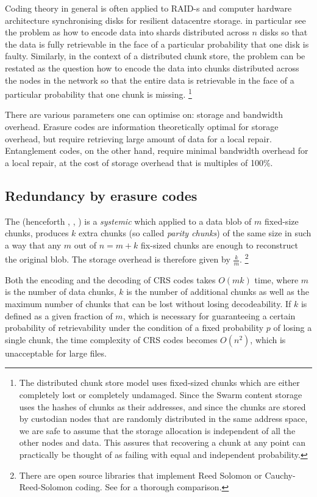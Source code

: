 Coding theory in general is often applied to RAID-s and computer hardware architecture synchronising disks for resilient datacentre storage.
 in particular see the problem as how to encode data into shards distributed across $n$ disks so that the data is fully retrievable in the face of a particular probability that one disk is faulty.
Similarly, in the context of a distributed chunk store, the problem can be restated as the question how to encode the data into chunks distributed across the nodes in the network so that the entire data is retrievable in the face of a particular probability that one chunk is missing.%
%
\footnote{The distributed chunk store model uses fixed-sized chunks which are either completely lost or completely undamaged. Since the Swarm content storage uses the hashes of chunks as their addresses, and since the chunks are stored by custodian nodes that are randomly distributed in the same address space, we are safe to assume that the storage allocation is independent of all the other nodes and data. This assures that recovering a chunk at any point can practically be thought of as failing with equal and independent probability.}

There are various parameters one can optimise on: storage and bandwidth overhead. Erasure codes are information theoretically optimal for storage overhead, but require retrieving large amount of data for a local repair.
Entanglement codes, on the other hand, require minimal bandwidth overhead for a local repair, at the cost of storage overhead that is multiples of 100\%. 

\subsection{Redundancy by erasure codes \statusgreen}\label{sec:erasure}


The  (henceforth , \cite{lubyetal1995CRS}, \cite{plank2006optimizing}) is a \emph{systemic}  which applied to a data blob of $m$ fixed-size chunks, produces $k$ extra chunks (so called \emph{parity chunks}) of the same size in such a way that any $m$ out of $n=m+k$ fix-sized chunks are enough to reconstruct the original blob. The storage overhead is therefore given by $\frac{k}{m}$.%
%
\footnote{%
There are open source libraries that implement Reed Solomon or Cauchy-Reed-Solomon coding. See \cite{plank2009performance} for a thorough comparison.}

Both the encoding and the decoding of CRS codes takes $O(mk)$ time, where $m$ is the number of data chunks, $k$ is the number of additional chunks as well as the maximum number of chunks that can be lost without losing decodeability. If $k$ is defined as a given fraction of $m$, which is necessary for guaranteeing a certain probability of retrievability under the condition of a fixed probability $p$ of losing a single chunk, the time complexity of CRS codes becomes $O(n^2)$, which is unacceptable for large files. 

